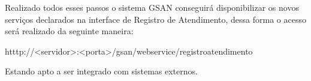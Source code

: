 Realizado todos esses passos o sistema GSAN conseguirá disponibilizar os novos serviços declarados na interface de Registro de Atendimento, dessa forma o acesso será realizado da seguinte maneira:

\begin{description}
	\item htttp://<servidor>:<porta>/gsan/webservice/registroatendimento
\end{description}

Estando apto a ser integrado com sistemas externos. 